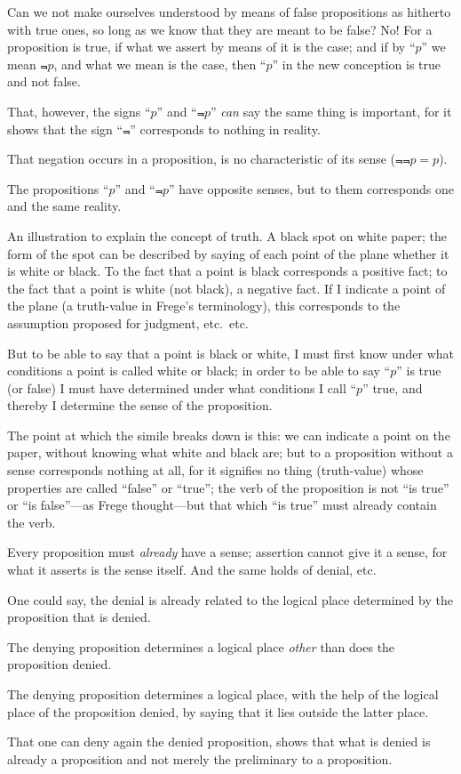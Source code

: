 {Can we not make ourselves understood by
means of false propositions as hitherto with true
ones, so long as we know that they are meant to
be false? No! For a proposition is true, if
what we assert by means of it is the case; and if
by ``$p$'' we mean $\Not{p}$, and what we mean is the
case, then ``$p$'' in the new conception is true
and not false.}


{That, however, the signs ``$p$'' and ``$\Not{p}$'' \emph{can}
say the same thing is important, for it shows
that the sign ``$\Not{}$'' corresponds to nothing in
reality.

That negation occurs in a proposition, is no
characteristic of its sense ($\Not{\Not{p = p}}$).

The propositions ``$p$'' and ``$\Not{p}$'' have opposite
senses, but to them corresponds one and
the same reality.}


{An illustration to explain the concept of truth.
A black spot on white paper; the form of the spot
can be described by saying of each point of the
plane whether it is white or black. To the fact
that a point is black corresponds a positive fact;
to the fact that a point is white (not black), a
negative fact. If I indicate a point of the plane
(a truth-value in Frege's terminology), this corresponds
to the assumption proposed for judgment,
etc.\ etc.

But to be able to say that a point is black or
white, I must first know under what conditions a
point is called white or black; in order to be able
to say ``$p$'' is true (or false) I must have determined
under what conditions I call ``$p$'' true,
and thereby I determine the sense of the proposition.

The point at which the simile breaks down is
this: we can indicate a point on the paper, without
knowing what white and black are; but to a proposition
without a sense corresponds nothing at
all, for it signifies no thing (truth-value) whose
properties are called ``false'' or ``true''; the verb
of the proposition is not ``is true'' or ``is false''---as
Frege thought---but that which ``is true'' must
already contain the verb.}


{Every proposition must \emph{already} have a sense;
assertion cannot give it a sense, for what it asserts
is the sense itself. And the same holds of
denial, etc.}


{One could say, the denial is already related to
the logical place determined by the proposition
that is denied.

The denying proposition determines a logical
place \emph{other} than does the proposition denied.

The denying proposition determines a logical
place, with the help of the logical place of the
proposition denied, by saying that it lies outside
the latter place.

That one can deny again the denied proposition,
shows that what is denied is already a proposition
and not merely the preliminary to a
proposition.}


